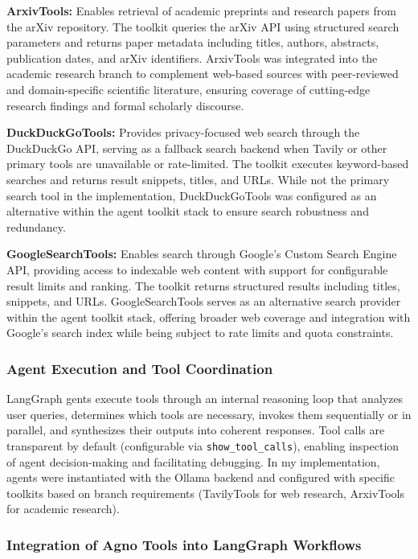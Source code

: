 \textbf{ArxivTools:} Enables retrieval of academic preprints and research papers from the arXiv repository. The toolkit queries the arXiv API using structured search parameters and returns paper metadata including titles, authors, abstracts, publication dates, and arXiv identifiers. ArxivTools was integrated into the academic research branch to complement web-based sources with peer-reviewed and domain-specific scientific literature, ensuring coverage of cutting-edge research findings and formal scholarly discourse.

\textbf{DuckDuckGoTools:} Provides privacy-focused web search through the DuckDuckGo API, serving as a fallback search backend when Tavily or other primary tools are unavailable or rate-limited. The toolkit executes keyword-based searches and returns result snippets, titles, and URLs. While not the primary search tool in the implementation, DuckDuckGoTools was configured as an alternative within the agent toolkit stack to ensure search robustness and redundancy.

\textbf{GoogleSearchTools:} Enables search through Google's Custom Search Engine API, providing access to indexable web content with support for configurable result limits and ranking. The toolkit returns structured results including titles, snippets, and URLs. GoogleSearchTools serves as an alternative search provider within the agent toolkit stack, offering broader web coverage and integration with Google's search index while being subject to rate limits and quota constraints.

\subsubsection{Agent Execution and Tool Coordination}

LangGraph gents execute tools through an internal reasoning loop that analyzes user queries, determines which tools are necessary, invokes them sequentially or in parallel, and synthesizes their outputs into coherent responses. Tool calls are transparent by default (configurable via \texttt{show\_tool\_calls}), enabling inspection of agent decision-making and facilitating debugging. In my implementation, agents were instantiated with the Ollama backend and configured with specific toolkits based on branch requirements (TavilyTools for web research, ArxivTools for academic research).

\subsubsection{Integration of Agno Tools into LangGraph Workflows}


